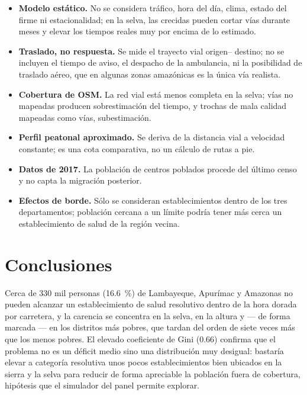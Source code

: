 \documentclass[11pt,a4paper]{article}
\begin{document}
\begin{itemize}
  \item \textbf{Modelo est\'atico.} No se considera tr\'afico, hora del d\'ia,
        clima, estado del firme ni estacionalidad; en la selva, las crecidas
        pueden cortar v\'ias durante meses y elevar los tiempos reales muy por
        encima de lo estimado.
  \item \textbf{Traslado, no respuesta.} Se mide el trayecto vial origen--%
        destino; no se incluyen el tiempo de aviso, el despacho de la
        ambulancia, ni la posibilidad de traslado a\'ereo, que en algunas
        zonas amaz\'onicas es la \'unica v\'ia realista.
  \item \textbf{Cobertura de OSM.} La red vial est\'a menos completa en la
        selva; v\'ias no mapeadas producen sobrestimaci\'on del tiempo, y
        trochas de mala calidad mapeadas como v\'ias, subestimaci\'on.
  \item \textbf{Perfil peatonal aproximado.} Se deriva de la distancia vial a
        velocidad constante; es una cota comparativa, no un c\'alculo de rutas
        a pie.
  \item \textbf{Datos de 2017.} La poblaci\'on de centros poblados procede del
        \'ultimo censo y no capta la migraci\'on posterior.
  \item \textbf{Efectos de borde.} S\'olo se consideran establecimientos
        dentro de los tres departamentos; poblaci\'on cercana a un l\'imite
        podr\'ia tener m\'as cerca un establecimiento de salud de la regi\'on
        vecina.
\end{itemize}

\section{Conclusiones}
Cerca de \num{330} mil personas (\SI{16.6}{\percent}) de Lambayeque, Apur\'imac y
Amazonas no pueden alcanzar un establecimiento de salud resolutivo dentro de la
hora dorada por carretera, y la carencia se concentra en la selva, en la altura
y --- de forma marcada --- en los distritos m\'as pobres, que tardan del orden de
siete veces m\'as que los menos pobres. El elevado coeficiente de Gini
(\num{0.66}) confirma que el problema no es un d\'eficit medio sino una
distribuci\'on muy desigual: bastar\'ia elevar a categor\'ia resolutiva unos
pocos establecimientos bien ubicados en la sierra y la selva para reducir de
forma apreciable la poblaci\'on fuera de cobertura, hip\'otesis que el simulador
del panel permite explorar.
\end{document}
